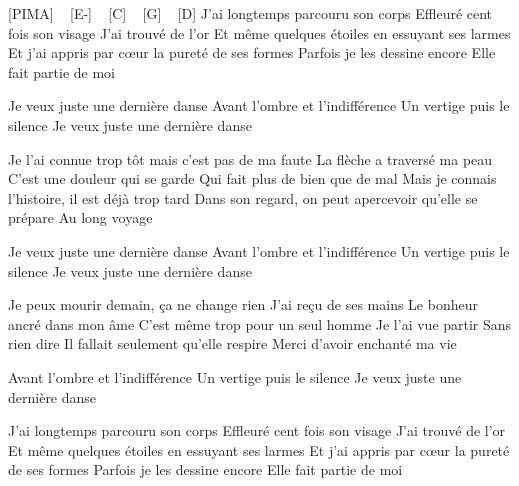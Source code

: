 [PIMA] ~
[E-] ~ [C] ~ [G] ~ [D]
J'ai longtemps parcouru son corps
Effleuré cent fois son visage
J'ai trouvé de l'or
Et même quelques étoiles en essuyant ses larmes
Et j'ai appris par cœur la pureté de ses formes
Parfois je les dessine encore
Elle fait partie de moi

Je veux juste une dernière danse
Avant l'ombre et l'indifférence
Un vertige puis le silence
Je veux juste une dernière danse

Je l'ai connue trop tôt mais c'est pas de ma faute
La flèche a traversé ma peau
C'est une douleur qui se garde
Qui fait plus de bien que de mal
Mais je connais l'histoire, il est déjà trop tard
Dans son regard, on peut apercevoir qu'elle se prépare
Au long voyage

Je veux juste une dernière danse
Avant l'ombre et l'indifférence
Un vertige puis le silence
Je veux juste une dernière danse

Je peux mourir demain, ça ne change rien
J'ai reçu de ses mains
Le bonheur ancré dans mon âme
C'est même trop pour un seul homme
Je l'ai vue partir Sans rien dire
Il fallait seulement qu'elle respire
Merci d'avoir enchanté ma vie

Avant l'ombre et l'indifférence
Un vertige puis le silence
Je veux juste une dernière danse

J'ai longtemps parcouru son corps
Effleuré cent fois son visage
J'ai trouvé de l'or
Et même quelques étoiles en essuyant ses larmes
Et j'ai appris par cœur la pureté de ses formes
Parfois je les dessine encore
Elle fait partie de moi

